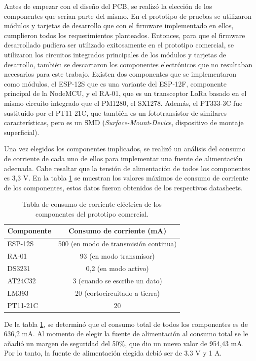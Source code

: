 Antes de empezar con el diseño del PCB, se realizó la elección de los componentes que serían parte del mismo. En el prototipo de pruebas se utilizaron módulos y tarjetas de desarrollo que con el firmware implementado en ellos, cumplieron todos los requerimientos planteados. Entonces, para que el firmware desarrollado pudiera ser utilizado exitosamente en el prototipo comercial, se utilizaron los circuitos integrados principales de los módulos y tarjetas de desarrollo, también se descartaron los componentes electrónicos que no resultaban necesarios para este trabajo. Existen dos componentes que se implementaron como módulos, el ESP-12S que es una variante del ESP-12F, componente principal de la NodeMCU, y el RA-01, que es un transceptor LoRa basado en el mismo circuito integrado que el PM1280, el SX1278. Además, el PT333-3C fue sustituido por el PT11-21C, que también es un fototransistor de similares características, pero es un SMD (\textit{Surface-Mount-Device}, dispositivo de montaje superficial).

Una vez elegidos los componentes implicados, se realizó un análisis del consumo de corriente de cada uno de ellos para implementar una fuente de alimentación adecuada. Cabe resaltar que la tensión de alimentación de todos los componentes es 3,3 V. En la tabla \ref{tab:componentsPower} se muestran los valores máximos de consumo de corriente de los componentes, estos datos fueron obtenidos de los respectivos datasheets.

\begin{table}[h]
	\centering
	\caption[Consumo de corriente del prototipo comercial]{Tabla de consumo de corriente eléctrica de los componentes del prototipo comercial.}
	\begin{tabular}{l c}    
		\toprule
		\textbf{Componente} & \textbf{Consumo de corriente (mA)} \\
		\midrule
		ESP-12S 	& 500 (en modo de transmisión continua) \\		
		RA-01		& 93 (en modo transmisor)\\
		DS3231		& 0,2 (en modo activo) \\
		AT24C32 	& 3 (cuando se escribe un dato)\\
		LM393 		& 20 (cortocircuitado a tierra) \\
		PT11-21C	& 20 \\
		\bottomrule
		\hline
	\end{tabular}
	\label{tab:componentsPower}
\end{table}

De la tabla \ref{tab:componentsPower}, se determinó que el consumo total de todos los componentes es de 636,2 mA. Al momento de elegir la fuente de alimentación al consumo total se le añadió un margen de seguridad del 50\%, que dio un nuevo valor de 954,43 mA. Por lo tanto, la fuente de alimentación elegida debió ser de 3.3 V y 1 A.

